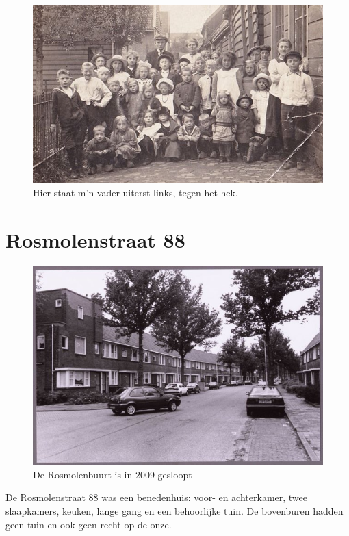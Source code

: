 \documentclass[10pt,twoside, openright]{memoir}
\begin{document}
\begin{figure}
\includegraphics[width=\textwidth]{img/ch2/ch2-afb13}
\caption*{\footnotesize Hier staat m’n vader uiterst links, tegen het hek.}
\end{figure}


\chapter{Rosmolenstraat 88} %
\label{cha:rosmolenstraat}

\begin{figure}
\includegraphics[width=\textwidth]{img/33Rosmolenstraat}
\caption*{\footnotesize De Rosmolenbuurt is in 2009 gesloopt}
\end{figure}

De Rosmolenstraat 88 was een benedenhuis: voor- en achterkamer, twee slaapkamers, keuken, lange gang en een behoorlijke tuin. De bovenburen hadden geen tuin en ook geen recht op de onze. 
\end{document}
